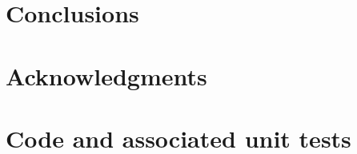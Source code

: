 \documentclass[12pt,letterpaper]{refart}
\begin{document}


\section{Conclusions}



\section{Acknowledgments}



\renewcommand*{\bibfont}{\raggedright\normalfont\small}




\clearpage
\appendix
\section{Code and associated unit tests}
\label{sec:code}


\end{document}
